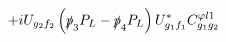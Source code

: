 %
\begin{dmath*}
%
  +  iU_{g_2 f_2} \left(\slashed{p}_{3} P_L - \slashed{p}_{4} P_L\right) U_{g_1 f_1}^* C^{ \varphi  l1}_{g_1 g_2}
%
\end{dmath*}
%

